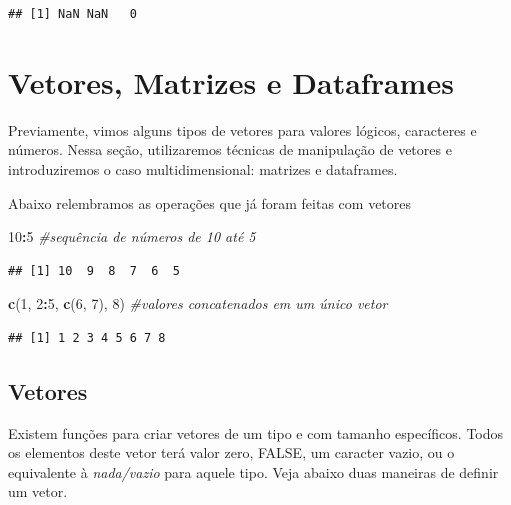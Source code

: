\documentclass[
]{book}
\newenvironment{Shaded}{\begin{snugshade}}{\end{snugshade}}
\newcommand{\CommentTok}[1]{\textcolor[rgb]{0.56,0.35,0.01}{\textit{#1}}}
\newcommand{\DecValTok}[1]{\textcolor[rgb]{0.00,0.00,0.81}{#1}}
\newcommand{\FunctionTok}[1]{\textcolor[rgb]{0.13,0.29,0.53}{\textbf{#1}}}
\newcommand{\NormalTok}[1]{#1}
\newcommand{\SpecialCharTok}[1]{\textcolor[rgb]{0.81,0.36,0.00}{\textbf{#1}}}
\begin{document}
\begin{verbatim}
## [1] NaN NaN   0
\end{verbatim}

\section{Vetores, Matrizes e Dataframes}\label{vetores-matrizes-e-dataframes}

Previamente, vimos alguns tipos de vetores para valores lógicos, caracteres e números.
Nessa seção, utilizaremos técnicas de manipulação de vetores e introduziremos o caso multidimensional: matrizes e dataframes.

Abaixo relembramos as operações que já foram feitas com vetores

\begin{Shaded}
\begin{Highlighting}[]
\DecValTok{10}\SpecialCharTok{:}\DecValTok{5}                    \CommentTok{\#sequência de números de 10 até 5}
\end{Highlighting}
\end{Shaded}

\begin{verbatim}
## [1] 10  9  8  7  6  5
\end{verbatim}

\begin{Shaded}
\begin{Highlighting}[]
\FunctionTok{c}\NormalTok{(}\DecValTok{1}\NormalTok{, }\DecValTok{2}\SpecialCharTok{:}\DecValTok{5}\NormalTok{, }\FunctionTok{c}\NormalTok{(}\DecValTok{6}\NormalTok{, }\DecValTok{7}\NormalTok{), }\DecValTok{8}\NormalTok{)   }\CommentTok{\#valores concatenados em um único vetor}
\end{Highlighting}
\end{Shaded}

\begin{verbatim}
## [1] 1 2 3 4 5 6 7 8
\end{verbatim}

\subsection{Vetores}\label{vetores}

Existem funções para criar vetores de um tipo e com tamanho específicos.
Todos os elementos deste vetor terá valor zero, FALSE, um caracter vazio, ou o equivalente à \emph{nada/vazio} para aquele tipo.
Veja abaixo duas maneiras de definir um vetor.
\end{document}
